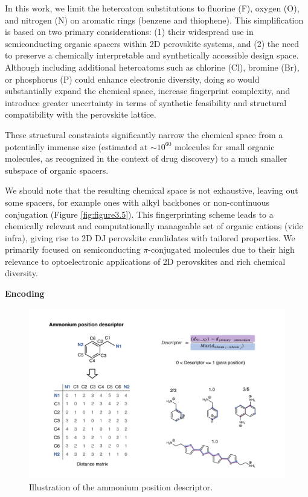 In this work, we limit the heteroatom substitutions to fluorine (F), oxygen (O), and nitrogen (N) on aromatic rings (benzene and thiophene). This simplification is based on two primary considerations: (1) their widespread use in semiconducting organic spacers within 2D perovskite systems, and (2) the need to preserve a chemically interpretable and synthetically accessible design space. Although including additional heteroatoms such as chlorine (Cl), bromine (Br), or phosphorus (P) could enhance electronic diversity, doing so would substantially expand the chemical space, increase fingerprint complexity, and introduce greater uncertainty in terms of synthetic feasibility and structural compatibility with the perovskite lattice.

These structural constraints significantly narrow the chemical space from a potentially immense size (estimated at $\sim10^{60}$ molecules for small organic molecules, as recognized in the context of drug discovery\cite{RN458}) to a much smaller subspace of organic spacers. 

We should note that the resulting chemical space is not exhaustive, leaving out some spacers, for example ones with alkyl backbones or non-continuous conjugation (Figure \ref{fig:figure3.5}). This fingerprinting scheme leads to a chemically relevant and computationally manageable set of organic cations (vide infra), giving rise to 2D DJ perovskite candidates with tailored properties. We primarily focused on semiconducting $\pi$-conjugated molecules due to their high relevance to optoelectronic applications of 2D perovskites and rich chemical diversity.

\textbf{Encoding}

\begin{figure}[ht]
    \centering
    \includegraphics[width=\textwidth]{figures/methodology/figure3-6.pdf}
    \caption{Illustration of the ammonium position descriptor.}
    \label{fig:figure3.6}
\end{figure}

